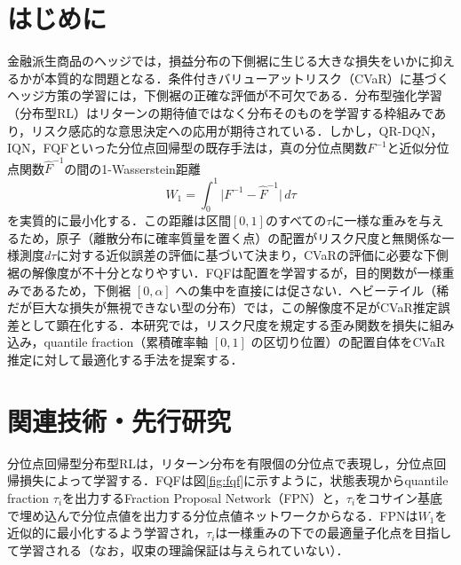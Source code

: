 \documentclass[a4paper,twocolumn,10pt]{jsarticle}
\begin{document}

\section{はじめに}
金融派生商品のヘッジでは，損益分布の下側裾に生じる大きな損失をいかに抑えるかが本質的な問題となる．条件付きバリューアットリスク（CVaR）に基づくヘッジ方策の学習には，下側裾の正確な評価が不可欠である．分布型強化学習（分布型RL）はリターンの期待値ではなく分布そのものを学習する枠組みであり，リスク感応的な意思決定への応用が期待されている．しかし，QR-DQN，IQN\cite{iqn}，FQF\cite{fqf}といった分位点回帰型の既存手法は，真の分位点関数$F^{-1}$と近似分位点関数$\hat F^{-1}$の間の1-Wasserstein距離
\begin{equation}
W_1=\int_0^1 \bigl|F^{-1}-\hat F^{-1}\bigr|\,d\tau
\end{equation}
を実質的に最小化する．この距離は区間$[0,1]$のすべての$\tau$に一様な重みを与えるため，原子（離散分布に確率質量を置く点）の配置がリスク尺度と無関係な一様測度$d\tau$に対する近似誤差の評価に基づいて決まり，CVaRの評価に必要な下側裾の解像度が不十分となりやすい．FQFは配置を学習するが，目的関数が一様重みであるため，下側裾 $[0,\alpha]$ への集中を直接には促さない．ヘビーテイル（稀だが巨大な損失が無視できない型の分布）では，この解像度不足がCVaR推定誤差として顕在化する．本研究では，リスク尺度を規定する歪み関数を損失に組み込み，quantile fraction（累積確率軸 $[0, 1]$ の区切り位置）の配置自体をCVaR推定に対して最適化する手法を提案する．

\section{関連技術・先行研究}
分位点回帰型分布型RLは，リターン分布を有限個の分位点で表現し，分位点回帰損失によって学習する．FQF\cite{fqf}は図\ref{fig:fqf}に示すように，状態表現からquantile fraction $\tau_i$を出力するFraction Proposal Network（FPN）と，$\tau_i$をコサイン基底で埋め込んで分位点値を出力する分位点値ネットワークからなる．FPNは$W_1$を近似的に最小化するよう学習され，$\tau_i$は一様重みの下での最適量子化点を目指して学習される（なお，収束の理論保証は与えられていない）．
\end{document}
